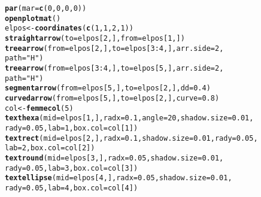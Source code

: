 \documentclass{article}\usepackage[]{graphicx}\usepackage[]{color}
\makeatletter
\newcommand{\hlnum}[1]{\textcolor[rgb]{0.686,0.059,0.569}{#1}}%
\newcommand{\hlstr}[1]{\textcolor[rgb]{0.192,0.494,0.8}{#1}}%
\newcommand{\hlopt}[1]{\textcolor[rgb]{0,0,0}{#1}}%
\newcommand{\hlstd}[1]{\textcolor[rgb]{0.345,0.345,0.345}{#1}}%
\newcommand{\hlkwb}[1]{\textcolor[rgb]{0.69,0.353,0.396}{#1}}%
\newcommand{\hlkwc}[1]{\textcolor[rgb]{0.333,0.667,0.333}{#1}}%
\newcommand{\hlkwd}[1]{\textcolor[rgb]{0.737,0.353,0.396}{\textbf{#1}}}%
\newenvironment{kframe}{%
 \def\at@end@of@kframe{}%
 \ifinner\ifhmode%
  \def\at@end@of@kframe{\end{minipage}}%
  \begin{minipage}{\columnwidth}%
 \fi\fi%
 \def\FrameCommand##1{\hskip\@totalleftmargin \hskip-\fboxsep
 \colorbox{shadecolor}{##1}\hskip-\fboxsep
     \hskip-\linewidth \hskip-\@totalleftmargin \hskip\columnwidth}%
 \MakeFramed {\advance\hsize-\width
   \@totalleftmargin\z@ \linewidth\hsize
   \@setminipage}}%
 {\par\unskip\endMakeFramed%
 \at@end@of@kframe}
\newenvironment{knitrout}{}{} %
\makeatother
\begin{document}
\begin{knitrout}
\begin{kframe}
\begin{alltt}
\hlkwd{par}\hlstd{(}\hlkwc{mar} \hlstd{=} \hlkwd{c}\hlstd{(}\hlnum{0}\hlstd{,} \hlnum{0}\hlstd{,} \hlnum{0}\hlstd{,} \hlnum{0}\hlstd{))}
\hlkwd{openplotmat}\hlstd{()}
\hlstd{elpos} \hlkwb{<-} \hlkwd{coordinates}\hlstd{(}\hlkwd{c}\hlstd{(}\hlnum{1}\hlstd{,} \hlnum{1}\hlstd{,} \hlnum{2}\hlstd{,} \hlnum{1}\hlstd{))}
\hlkwd{straightarrow}\hlstd{(}\hlkwc{to} \hlstd{= elpos[}\hlnum{2}\hlstd{, ],} \hlkwc{from} \hlstd{= elpos[}\hlnum{1}\hlstd{, ])}
\hlkwd{treearrow}\hlstd{(}\hlkwc{from} \hlstd{= elpos[}\hlnum{2}\hlstd{, ],} \hlkwc{to} \hlstd{= elpos[}\hlnum{3}\hlopt{:}\hlnum{4}\hlstd{, ],} \hlkwc{arr.side} \hlstd{=} \hlnum{2}\hlstd{,}
    \hlkwc{path} \hlstd{=} \hlstr{"H"}\hlstd{)}
\hlkwd{treearrow}\hlstd{(}\hlkwc{from} \hlstd{= elpos[}\hlnum{3}\hlopt{:}\hlnum{4}\hlstd{, ],} \hlkwc{to} \hlstd{= elpos[}\hlnum{5}\hlstd{, ],} \hlkwc{arr.side} \hlstd{=} \hlnum{2}\hlstd{,}
    \hlkwc{path} \hlstd{=} \hlstr{"H"}\hlstd{)}
\hlkwd{segmentarrow}\hlstd{(}\hlkwc{from} \hlstd{= elpos[}\hlnum{5}\hlstd{, ],} \hlkwc{to} \hlstd{= elpos[}\hlnum{2}\hlstd{, ],} \hlkwc{dd} \hlstd{=} \hlnum{0.4}\hlstd{)}
\hlkwd{curvedarrow}\hlstd{(}\hlkwc{from} \hlstd{= elpos[}\hlnum{5}\hlstd{, ],} \hlkwc{to} \hlstd{= elpos[}\hlnum{2}\hlstd{, ],} \hlkwc{curve} \hlstd{=} \hlnum{0.8}\hlstd{)}
\hlstd{col} \hlkwb{<-} \hlkwd{femmecol}\hlstd{(}\hlnum{5}\hlstd{)}
\hlkwd{texthexa}\hlstd{(}\hlkwc{mid} \hlstd{= elpos[}\hlnum{1}\hlstd{, ],} \hlkwc{radx} \hlstd{=} \hlnum{0.1}\hlstd{,} \hlkwc{angle} \hlstd{=} \hlnum{20}\hlstd{,} \hlkwc{shadow.size} \hlstd{=} \hlnum{0.01}\hlstd{,}
    \hlkwc{rady} \hlstd{=} \hlnum{0.05}\hlstd{,} \hlkwc{lab} \hlstd{=} \hlnum{1}\hlstd{,} \hlkwc{box.col} \hlstd{= col[}\hlnum{1}\hlstd{])}
\hlkwd{textrect}\hlstd{(}\hlkwc{mid} \hlstd{= elpos[}\hlnum{2}\hlstd{, ],} \hlkwc{radx} \hlstd{=} \hlnum{0.1}\hlstd{,} \hlkwc{shadow.size} \hlstd{=} \hlnum{0.01}\hlstd{,} \hlkwc{rady} \hlstd{=} \hlnum{0.05}\hlstd{,}
    \hlkwc{lab} \hlstd{=} \hlnum{2}\hlstd{,} \hlkwc{box.col} \hlstd{= col[}\hlnum{2}\hlstd{])}
\hlkwd{textround}\hlstd{(}\hlkwc{mid} \hlstd{= elpos[}\hlnum{3}\hlstd{, ],} \hlkwc{radx} \hlstd{=} \hlnum{0.05}\hlstd{,} \hlkwc{shadow.size} \hlstd{=} \hlnum{0.01}\hlstd{,}
    \hlkwc{rady} \hlstd{=} \hlnum{0.05}\hlstd{,} \hlkwc{lab} \hlstd{=} \hlnum{3}\hlstd{,} \hlkwc{box.col} \hlstd{= col[}\hlnum{3}\hlstd{])}
\hlkwd{textellipse}\hlstd{(}\hlkwc{mid} \hlstd{= elpos[}\hlnum{4}\hlstd{, ],} \hlkwc{radx} \hlstd{=} \hlnum{0.05}\hlstd{,} \hlkwc{shadow.size} \hlstd{=} \hlnum{0.01}\hlstd{,}
    \hlkwc{rady} \hlstd{=} \hlnum{0.05}\hlstd{,} \hlkwc{lab} \hlstd{=} \hlnum{4}\hlstd{,} \hlkwc{box.col} \hlstd{= col[}\hlnum{4}\hlstd{])}

\end{alltt}
\end{kframe}
\end{knitrout}
\end{document}
